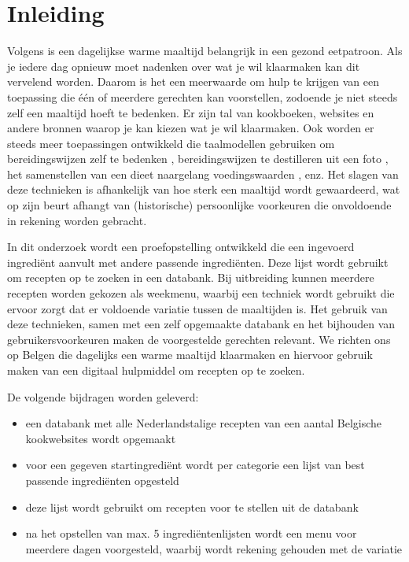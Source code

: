 \documentclass{hogent-article}
\begin{document}


\section{Inleiding}%
\label{sec:inleiding}


Volgens \textcite{Galle2016} is een dagelijkse warme maaltijd belangrijk in een gezond eetpatroon. Als je iedere dag opnieuw moet nadenken over wat je wil klaarmaken kan dit vervelend worden. Daarom is het een meerwaarde om hulp te krijgen van een toepassing die één of meerdere gerechten kan voorstellen, zodoende je niet steeds zelf een maaltijd hoeft te bedenken. Er zijn tal van kookboeken, websites en andere bronnen waarop je kan kiezen wat je wil klaarmaken. Ook worden er steeds meer toepassingen ontwikkeld die taalmodellen gebruiken om bereidingswijzen zelf te bedenken \autocite{Santos2020}, bereidingswijzen te destilleren uit een foto \autocite{Salvador2019}, het samenstellen van een dieet naargelang voedingswaarden \autocite{Aljbawi2020}, enz. Het slagen van deze technieken is afhankelijk van hoe sterk een maaltijd wordt gewaardeerd, wat op zijn beurt afhangt van (historische) persoonlijke voorkeuren die onvoldoende in rekening worden gebracht.

In dit onderzoek wordt een proefopstelling ontwikkeld die een ingevoerd ingrediënt aanvult met andere passende ingrediënten. Deze lijst wordt gebruikt om recepten op te zoeken in een databank. Bij uitbreiding kunnen meerdere recepten worden gekozen als weekmenu, waarbij een techniek wordt gebruikt die ervoor zorgt dat er voldoende variatie tussen de maaltijden is. Het gebruik van deze technieken, samen met een zelf opgemaakte databank en het bijhouden van gebruikersvoorkeuren maken de voorgestelde gerechten relevant. We richten ons op Belgen die dagelijks een warme maaltijd klaarmaken en hiervoor gebruik maken van een digitaal hulpmiddel om recepten op te zoeken. 

De volgende bijdragen worden geleverd:
\begin{itemize}
    \item een databank met alle Nederlandstalige recepten van een aantal Belgische kookwebsites wordt opgemaakt
    \item voor een gegeven startingrediënt wordt per categorie een lijst van best passende ingrediënten opgesteld
    \item deze lijst wordt gebruikt om recepten voor te stellen uit de databank
    \item na het opstellen van max. 5 ingrediëntenlijsten wordt een menu voor meerdere dagen voorgesteld, waarbij wordt rekening gehouden met de variatie
\end{itemize}
\end{document}
